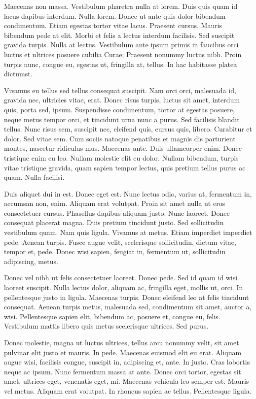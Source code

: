 \documentclass{article}
\begin{document}
Maecenas non massa. Vestibulum pharetra nulla at lorem. Duis quis quam id lacus
dapibus interdum. Nulla lorem. Donec ut ante quis dolor bibendum condimentum.
Etiam egestas tortor vitae lacus. Praesent cursus. Mauris bibendum pede at
elit. Morbi et felis a lectus interdum facilisis. Sed suscipit gravida turpis.
Nulla at lectus. Vestibulum ante ipsum primis in faucibus orci luctus et
ultrices posuere cubilia Curae; Praesent nonummy luctus nibh. Proin turpis
nunc, congue eu, egestas ut, fringilla at, tellus. In hac habitasse platea
dictumst.

Vivamus eu tellus sed tellus consequat suscipit. Nam orci orci, malesuada
id, gravida nec, ultricies vitae, erat. Donec risus turpis, luctus sit amet,
interdum quis, porta sed, ipsum. Suspendisse condimentum, tortor at egestas
posuere, neque metus tempor orci, et tincidunt urna nunc a purus. Sed facilisis
blandit tellus. Nunc risus sem, suscipit nec, eleifend quis, cursus quis,
libero. Curabitur et dolor. Sed vitae sem. Cum sociis natoque penatibus et
magnis dis parturient montes, nascetur ridiculus mus. Maecenas ante. Duis
ullamcorper enim. Donec tristique enim eu leo. Nullam molestie elit eu dolor.
Nullam bibendum, turpis vitae tristique gravida, quam sapien tempor lectus,
quis pretium tellus purus ac quam. Nulla facilisi.

Duis aliquet dui in est. Donec eget est. Nunc lectus odio, varius at,
fermentum in, accumsan non, enim. Aliquam erat volutpat. Proin sit amet nulla
ut eros consectetuer cursus. Phasellus dapibus aliquam justo. Nunc laoreet.
Donec consequat placerat magna. Duis pretium tincidunt justo. Sed sollicitudin
vestibulum quam. Nam quis ligula. Vivamus at metus. Etiam imperdiet imperdiet
pede. Aenean turpis. Fusce augue velit, scelerisque sollicitudin, dictum vitae,
tempor et, pede. Donec wisi sapien, feugiat in, fermentum ut, sollicitudin
adipiscing, metus.

Donec vel nibh ut felis consectetuer laoreet. Donec pede. Sed id quam id
wisi laoreet suscipit. Nulla lectus dolor, aliquam ac, fringilla eget, mollis
ut, orci. In pellentesque justo in ligula. Maecenas turpis. Donec eleifend leo
at felis tincidunt consequat. Aenean turpis metus, malesuada sed, condimentum
sit amet, auctor a, wisi. Pellentesque sapien elit, bibendum ac, posuere et,
congue eu, felis. Vestibulum mattis libero quis metus scelerisque ultrices. Sed
purus.

Donec molestie, magna ut luctus ultrices, tellus arcu nonummy velit, sit amet
pulvinar elit justo et mauris. In pede. Maecenas euismod elit eu erat. Aliquam
augue wisi, facilisis congue, suscipit in, adipiscing et, ante. In justo. Cras
lobortis neque ac ipsum. Nunc fermentum massa at ante. Donec orci tortor,
egestas sit amet, ultrices eget, venenatis eget, mi. Maecenas vehicula leo
semper est. Mauris vel metus. Aliquam erat volutpat. In rhoncus sapien ac
tellus. Pellentesque ligula.
\end{document}
